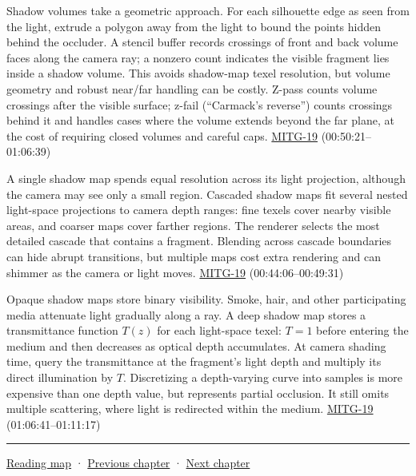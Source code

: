 Shadow volumes take a geometric approach. For each silhouette edge as seen from the light, extrude a polygon away from the light to bound the points hidden behind the occluder. A stencil buffer records crossings of front and back volume faces along the camera ray; a nonzero count indicates the visible fragment lies inside a shadow volume. This avoids shadow-map texel resolution, but volume geometry and robust near/far handling can be costly. Z-pass counts volume crossings after the visible surface; z-fail (``Carmack's reverse'') counts crossings behind it and handles cases where the volume extends beyond the far plane, at the cost of requiring closed volumes and careful caps. \hyperref[04-visual-computing-ii-ch036-mitg-19---shadow-maps]{MITG-19} (00:50:21--01:06:39)

A single shadow map spends equal resolution across its light projection, although the camera may see only a small region. Cascaded shadow maps fit several nested light-space projections to camera depth ranges: fine texels cover nearby visible areas, and coarser maps cover farther regions. The renderer selects the most detailed cascade that contains a fragment. Blending across cascade boundaries can hide abrupt transitions, but multiple maps cost extra rendering and can shimmer as the camera or light moves. \hyperref[04-visual-computing-ii-ch036-mitg-19---shadow-maps]{MITG-19} (00:44:06--00:49:31)

Opaque shadow maps store binary visibility. Smoke, hair, and other participating media attenuate light gradually along a ray. A deep shadow map stores a transmittance function \(T(z)\) for each light-space texel: \(T=1\) before entering the medium and then decreases as optical depth accumulates. At camera shading time, query the transmittance at the fragment's light depth and multiply its direct illumination by \(T\). Discretizing a depth-varying curve into samples is more expensive than one depth value, but represents partial occlusion. It still omits multiple scattering, where light is redirected within the medium. \hyperref[04-visual-computing-ii-ch036-mitg-19---shadow-maps]{MITG-19} (01:06:41--01:11:17)

\begin{center}\rule{0.5\linewidth}{0.5pt}\end{center}

\hyperref[volume-reading-map]{Reading map} · \hyperref[04-visual-computing-ii-ch027-mesh-queries-classification-and-clipping]{Previous chapter} · \hyperref[04-visual-computing-ii-ch029-acceleration-structures-and-robust-queries]{Next chapter}
